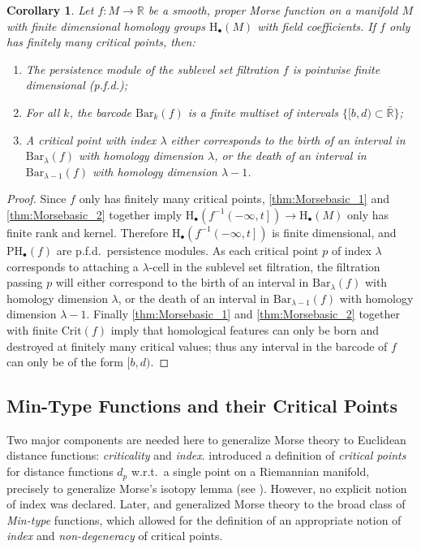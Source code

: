 \documentclass[11pt]{article}
\newcommand{\R}{\mathbb{R}}
\newcommand{\PHf}[2]{\mathrm{PH}_{#1}\left( {#2} \right)}
\newcommand{\Barc}[2]{\mathrm{Bar}_{#1}\left( {#2} \right)}
\renewcommand{\Bar}{\mathrm{Bar}}
\newcommand{\sublevel}[2]{{#1}^{-1}\left(-\infty, {#2}\right]}
\renewcommand{\H}{\mathrm{H}}
\theoremstyle{plain}
\newtheorem{cor}{Corollary}
\theoremstyle{definition}
\theoremstyle{remark}
\begin{document}
	\begin{cor} 
		\label{cor:PM_morse_function_tame} Let $f: M \to \R$ be a smooth, proper Morse function on a manifold $M$ with finite dimensional homology groups $\H_\bullet(M)$ with field coefficients. If $f$ only has finitely many critical points, then:
		\begin{enumerate}[label = (\roman*)]
			\item The persistence module of the sublevel set filtration $f$ is pointwise finite dimensional (p.f.d.);
			\item For all $k$, the barcode $\Bar_k(f)$ is a finite multiset of intervals $\{ [b,d) \subset \bar{\R} \}$;
			\item A critical point with index $\lambda$ either corresponds to the birth of an interval in $\Barc{\lambda}{f}$ with homology dimension $\lambda$, or the death of an interval in $\Barc{\lambda-1}{f}$ with homology dimension $\lambda - 1$.
		\end{enumerate} 
	\end{cor}
	\begin{proof}
		Since $f$ only has finitely many critical points, \ref{thm:Morsebasic_1} and \ref{thm:Morsebasic_2} together imply $\H_\bullet(\sublevel{f}{t}) \to \H_\bullet(M)$ only has finite rank and kernel. Therefore $\H_\bullet(\sublevel{f}{t})$ is finite dimensional, and $\PHf{\bullet}{f}$ are p.f.d.~persistence modules. As each critical point $p$ of index $\lambda$ corresponds to attaching a $\lambda$-cell in the sublevel set filtration, the filtration passing $p$ will either correspond to the birth of an interval in $\Barc{\lambda}{f}$ with homology dimension $\lambda$, or the death of an interval in $\Barc{\lambda-1}{f}$ with homology dimension $\lambda - 1$. Finally \ref{thm:Morsebasic_1} and \ref{thm:Morsebasic_2} together with finite $\mathrm{Crit}(f)$ imply that homological features can only be born and destroyed at finitely many critical values; thus any interval in the barcode of $f$ can only be of the form $ [b,d) $. 
	\end{proof}
	
	\subsection{Min-Type Functions and their Critical Points}
	\label{sec:min-type}
	
	Two major components are needed here to generalize Morse theory to Euclidean distance functions: \textit{criticality} and \textit{index}. \cite{grove_generalized_1977} introduced a definition of \textit{critical points} for distance functions $d_p$ w.r.t.~a single point on a Riemannian manifold, precisely to generalize Morse's isotopy lemma (see \citep{cheeger_critical_1991, grove_critical_1993}). 
	However, no explicit notion of index was declared. 
	Later, \cite{gershkovich_singularity_1997} and \cite{gershkovich_morse_1997} 
	generalized Morse theory to the broad class of \emph{Min-type} functions, which allowed for the definition of an appropriate notion of \textit{index} and \textit{non-degeneracy} of critical points.
	
\end{document}
